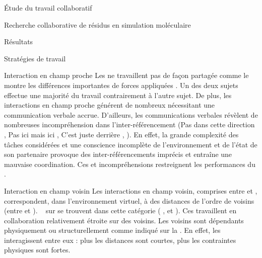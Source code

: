 \documentclass[myfrancais]{mythesis}
\begin{document}
\begin{mypart}{Étude du travail collaboratif}
\begin{mychapter}{Recherche collaborative de résidus en simulation moléculaire}
\begin{mysection}{Résultats}
\begin{mysubsection}{Stratégies de travail}
\begin{mysubsubsection}{Interaction en champ proche}
						Les  ne travaillent pas de façon partagée comme le montre les différences importantes de forces appliquées .
						Un des deux sujets effectue une majorité du travail contrairement à l'autre sujet.
						De plus, les interactions en champ proche générent de nombreux  nécessitant une communication verbale accrue.
						D'ailleurs, les communications verbales révèlent de nombreuses incompréhension dans l'inter-référencement (\og Pas dans cette direction \fg, \og Pas ici mais ici \fg, \og C'est juste derrière \fg, \myetc).
						En effet, la grande complexité des tâches considérées et une conscience incomplète de l'environnement et de l'état de son partenaire provoque des inter-référencements imprécis et entraîne une mauvaise coordination.
						Ces  et incompréhensions restreignent les performances du .
					\end{mysubsubsection}
					\begin{mysubsubsection}{Interaction en champ voisin}
						Les interactions en champ voisin, comprises entre  et , correspondent, dans l'environnement virtuel, à des distances de l'ordre de  voisins (entre  et ).
						~ sur  se trouvent dans cette catégorie ( ,  et ).
						Ces  travaillent en collaboration relativement étroite sur des  voisins.
						Les  voisins sont dépendants physiquement ou structurellement comme indiqué sur la .
						En effet, les  interagissent entre eux : plus les distances sont courtes, plus les contraintes physiques sont fortes.


\end{mysubsubsection}
\end{mysubsection}
\end{mysection}
\end{mychapter}
\end{mypart}
\end{document}
